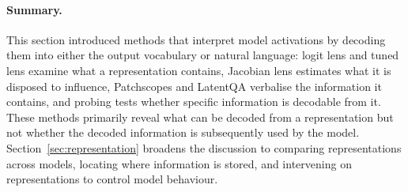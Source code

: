 \paragraph{Summary.} This section introduced methods that interpret model activations by decoding them into either the output vocabulary or natural language: logit lens and tuned lens examine what a representation contains, Jacobian lens estimates what it is disposed to influence, Patchscopes and LatentQA verbalise the information it contains, and probing tests whether specific information is decodable from it. These methods primarily reveal what can be decoded from a representation but not whether the decoded information is subsequently used by the model. Section~\ref{sec:representation} broadens the discussion to comparing representations across models, locating where information is stored, and intervening on representations to control model behaviour.



